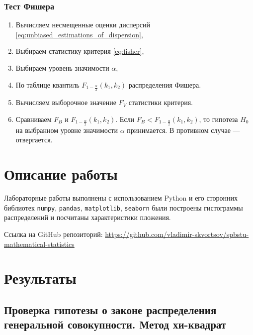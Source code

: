 \documentclass[12pt,a4paper]{article}
\begin{document}
	\subsubsection{Тест Фишера}

	\begin{enumerate}
		\item Вычисляем несмещенные оценки дисперсий
			\eqref{eq:unbiased_estimations_of_dispersion},
		\item Выбираем статистику критерия \eqref{eq:fisher},
		\item Выбираем уровень значимости \( \alpha \),
		\item По таблице квантиль \( F_{1 - \frac{\alpha}{2}} (k_1, k_2) \)
			распределения Фишера.
		\item Вычисляем выборочное значение \( F_V \) статистики критерия.
		\item Сравниваем \( F_B \) и \( F_{1 - \frac{\alpha}{2}} (k_1, k_2) \).
			Если \( F_B < F_{1 - \frac{\alpha}{2}} (k_1, k_2) \), то гипотеза
			\( H_0 \) на выбранном уровне значимости \( \alpha \) принимается.
			В противном случае — отвергается.
	\end{enumerate}

	\section{Описание работы}

	Лабораторные работы выполнены с использованием Python и его сторонних
	библиотек \verb!numpy!, \verb!pandas!, \verb!matplotlib!, \verb!seaborn! были
	построены гистограммы распределений и посчитаны характеристики пложения.

	Ссылка на GitHub репозиторий:
	\href{https://github.com/vladimir-skvortsov/spbstu-mathematical-statistics}
	{https://github.com/vladimir-skvortsov/spbstu-mathematical-statistics}

	\section{Результаты}

	\subsection{Проверка гипотезы о законе распределения генеральной
		совокупности. Метод хи-квадрат}
\end{document}
